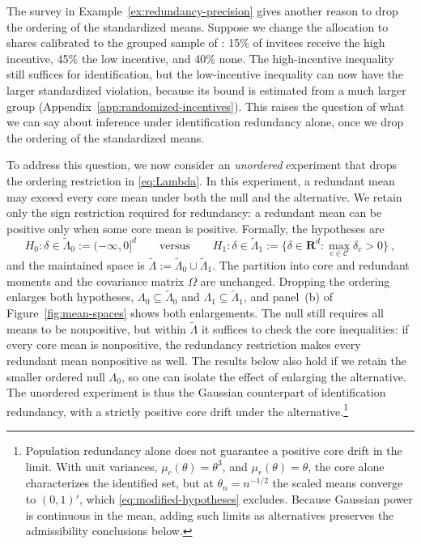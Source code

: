\documentclass[11pt]{article}
\newcommand{\red}[1]{{\color{red}#1}} %
\numberwithin{equation}{section}
\theoremstyle{definition}
\begin{document}
The survey in Example~\ref{ex:redundancy-precision} gives another reason to drop the ordering of the standardized means. Suppose we change the allocation to shares calibrated to the grouped sample of \citet{dutz/etal:26}: 15\% of invitees receive the high incentive, 45\% the low incentive, and 40\% none. The high-incentive inequality still suffices for identification, but the low-incentive inequality can now have the larger standardized violation, because its bound is estimated from a much larger group (Appendix~\ref{app:randomized-incentives}). This raises the question of what we can say about inference under identification redundancy alone, once we drop the ordering of the standardized means.

\red{To address this question}, we now consider an \emph{unordered} experiment that drops the ordering restriction in \eqref{eq:Lambda}. In this experiment, a redundant mean may exceed every core mean under both the null and the alternative. We retain only the sign restriction required for redundancy: a redundant mean can be positive only when some core mean is positive. Formally, the hypotheses are
\begin{equation}\label{eq:modified-hypotheses}
  H_0:\delta\in\widetilde\Lambda_0:=(-\infty,0]^d
  \qquad\text{versus}\qquad
  H_1:\delta\in\widetilde\Lambda_1:=\Big\{\delta\in\mathbf R^d:\max_{c\in\mathcal C}\delta_c>0\Big\}~,
\end{equation}
and the maintained space is $\widetilde\Lambda:=\widetilde\Lambda_0\cup\widetilde\Lambda_1$. The partition into core and redundant moments and the covariance matrix $\Omega$ are unchanged. Dropping the ordering enlarges both hypotheses, $\Lambda_0\subseteq\widetilde\Lambda_0$ and $\Lambda_1\subseteq\widetilde\Lambda_1$, and panel~(b) of Figure~\ref{fig:mean-spaces} shows both enlargements. The null still requires all means to be nonpositive, but within $\widetilde\Lambda$ it suffices to check the core inequalities: if every core mean is nonpositive, the redundancy restriction makes every redundant mean nonpositive as well. The results below also hold if we retain the smaller ordered null $\Lambda_0$, so one can isolate the effect of enlarging the alternative. \red{The unordered experiment is thus the Gaussian counterpart of identification redundancy, with a strictly positive core drift under the alternative.\footnote{\label{fn:zero-core-limit}\red{Population redundancy alone does not guarantee a positive core drift in the limit. With unit variances, $\mu_c(\theta)=\theta^3$, and $\mu_r(\theta)=\theta$, the core alone characterizes the identified set, but at $\theta_n=n^{-1/2}$ the scaled means converge to $(0,1)'$, which \eqref{eq:modified-hypotheses} excludes. Because Gaussian power is continuous in the mean, adding such limits as alternatives preserves the admissibility conclusions below.}}}
\end{document}
